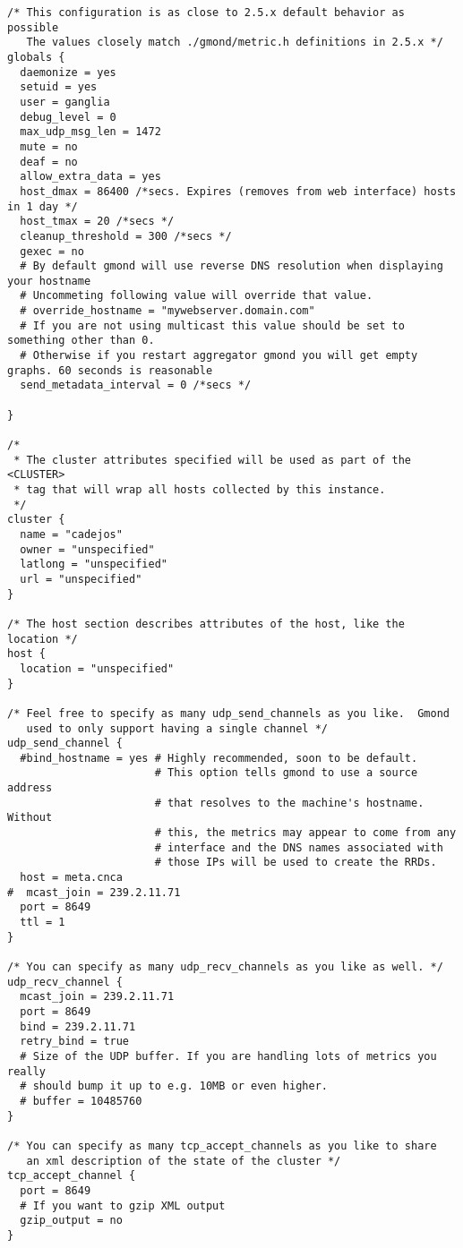 \begin{lstlisting}
/* This configuration is as close to 2.5.x default behavior as possible
   The values closely match ./gmond/metric.h definitions in 2.5.x */
globals {
  daemonize = yes
  setuid = yes
  user = ganglia
  debug_level = 0
  max_udp_msg_len = 1472
  mute = no
  deaf = no
  allow_extra_data = yes
  host_dmax = 86400 /*secs. Expires (removes from web interface) hosts in 1 day */
  host_tmax = 20 /*secs */
  cleanup_threshold = 300 /*secs */
  gexec = no
  # By default gmond will use reverse DNS resolution when displaying your hostname
  # Uncommeting following value will override that value.
  # override_hostname = "mywebserver.domain.com"
  # If you are not using multicast this value should be set to something other than 0.
  # Otherwise if you restart aggregator gmond you will get empty graphs. 60 seconds is reasonable
  send_metadata_interval = 0 /*secs */

}

/*
 * The cluster attributes specified will be used as part of the <CLUSTER>
 * tag that will wrap all hosts collected by this instance.
 */
cluster {
  name = "cadejos"
  owner = "unspecified"
  latlong = "unspecified"
  url = "unspecified"
}

/* The host section describes attributes of the host, like the location */
host {
  location = "unspecified"
}

/* Feel free to specify as many udp_send_channels as you like.  Gmond
   used to only support having a single channel */
udp_send_channel {
  #bind_hostname = yes # Highly recommended, soon to be default.
                       # This option tells gmond to use a source address
                       # that resolves to the machine's hostname.  Without
                       # this, the metrics may appear to come from any
                       # interface and the DNS names associated with
                       # those IPs will be used to create the RRDs.
  host = meta.cnca
#  mcast_join = 239.2.11.71
  port = 8649
  ttl = 1
}

/* You can specify as many udp_recv_channels as you like as well. */
udp_recv_channel {
  mcast_join = 239.2.11.71
  port = 8649
  bind = 239.2.11.71
  retry_bind = true
  # Size of the UDP buffer. If you are handling lots of metrics you really
  # should bump it up to e.g. 10MB or even higher.
  # buffer = 10485760
}

/* You can specify as many tcp_accept_channels as you like to share
   an xml description of the state of the cluster */
tcp_accept_channel {
  port = 8649
  # If you want to gzip XML output
  gzip_output = no
}
\end{lstlisting}

